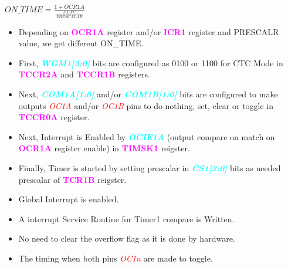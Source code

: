 \documentclass{article}
\newcommand{\bitFormat}[1]{\emph{\textbf{\textcolor{cyan}{#1}}}}
\newcommand{\regFormat}[1]{\textbf{\textcolor{magenta}{#1}}}
\newcommand{\pinFormat}[1]{\emph{\textcolor{red}{#1}}}
\begin{document}
\begin{center}
    $ON\_TIME = \frac{1 + OCR1A}{\frac{F\_CPU}{PRESCALAR}}$
\end{center}
\begin{itemize}
    \item Depending on \regFormat{OCR1A} register and/or \regFormat{ICR1} register and PRESCALR value, we get different ON\_TIME.
    \item First, \bitFormat{WGM1[3:0]} bits are configured as 0100 or 1100 for CTC Mode in \regFormat{TCCR2A} and \regFormat{TCCR1B} registers.
    \item Next, \bitFormat{COM1A[1:0]} and/or \bitFormat{COM1B[1:0]} bits are configured to make outputs \pinFormat{OC1A} and/or \pinFormat{OC1B} pins to do nothing, set, clear or toggle in \regFormat{TCCR0A} register.
    \item Next, Interrupt is Enabled by \bitFormat{OCIE1A} (output compare on match on \regFormat{OCR1A} register enable) in \regFormat{TIMSK1} reigster.
    \item Finally, Timer is started by setting prescalar in \bitFormat{CS1[2:0]} bits as needed prescalar of \regFormat{TCR1B} reigster.
    \item Global Interrupt is enabled.
    \item A interrupt Service Routine for Timer1 compare is Written.
    \item No need to clear the overflow flag as it is done by hardware.
    \item The timing when both pins \pinFormat{OC1n} are made to toggle.
\end{itemize}
\end{document}
